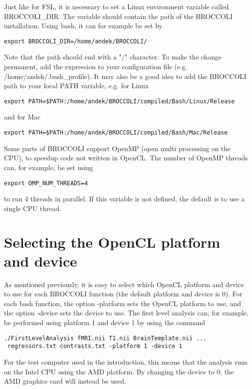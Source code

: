 Just like for FSL, it is necessary to set a Linux environment variable called BROCCOLI\_DIR. The variable should contain the path of the BROCCOLI installation. Using bash, it can for example be set by

\begin{verbatim}
export BROCCOLI_DIR=/home/andek/BROCCOLI/
\end{verbatim}
Note that the path should end with a "/" character. To make the change permanent, add the expression to your configuration file (e.g. /home/andek/.bash\_profile). It may also be a good idea to add the BROCCOLI path to your local PATH variable, e.g. for Linux

\begin{verbatim}
export PATH=$PATH:/home/andek/BROCCOLI/compiled/Bash/Linux/Release
\end{verbatim}
and for Mac

\begin{verbatim}
export PATH=$PATH:/home/andek/BROCCOLI/compiled/Bash/Mac/Release
\end{verbatim}
Some parts of BROCCOLI support OpenMP (open multi processing on the CPU), to speedup code not written in OpenCL. The number of OpenMP threads can, for example, be set using

\begin{verbatim}
export OMP_NUM_THREADS=4
\end{verbatim}
to run 4 threads in parallel. If this variable is not defined, the default is to use a single CPU thread.

\section{Selecting the OpenCL platform and device}

As mentioned previously, it is easy to select which OpenCL platform and device to use for each BROCCOLI function (the default platform and device is 0). For each bash function, the option -platform sets the OpenCL platform to use, and the option -device sets the device to use. The first level analysis can, for example, be performed using platform 1 and device 1 by using the command

\begin{verbatim}
./FirstLevelAnalysis fMRI.nii T1.nii BrainTemplate.nii ...
 regressors.txt contrasts.txt -platform 1 -device 1
\end{verbatim}
For the test computer used in the introduction, this means that the analysis runs on the Intel CPU using the AMD platform. By changing the device to 0, the AMD graphics card will instead be used. 


